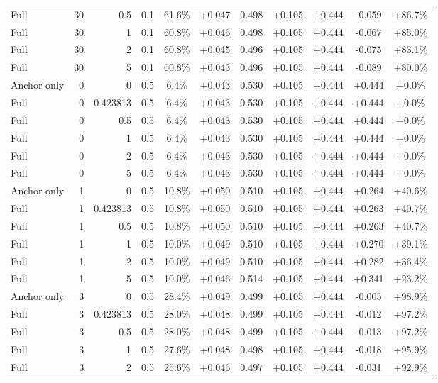 \begin{table}[htbp]
\begin{tabular}{lrrrccccccc}
Full & 30 & 0.5 & 0.1 & 61.6\% & +0.047 & 0.498 & +0.105 & +0.444 & -0.059 & +86.7\% \\
Full & 30 & 1 & 0.1 & 60.8\% & +0.046 & 0.498 & +0.105 & +0.444 & -0.067 & +85.0\% \\
Full & 30 & 2 & 0.1 & 60.8\% & +0.045 & 0.496 & +0.105 & +0.444 & -0.075 & +83.1\% \\
Full & 30 & 5 & 0.1 & 60.8\% & +0.043 & 0.496 & +0.105 & +0.444 & -0.089 & +80.0\% \\
Anchor only & 0 & 0 & 0.5 & 6.4\% & +0.043 & 0.530 & +0.105 & +0.444 & +0.444 & +0.0\% \\
Full & 0 & 0.423813 & 0.5 & 6.4\% & +0.043 & 0.530 & +0.105 & +0.444 & +0.444 & +0.0\% \\
Full & 0 & 0.5 & 0.5 & 6.4\% & +0.043 & 0.530 & +0.105 & +0.444 & +0.444 & +0.0\% \\
Full & 0 & 1 & 0.5 & 6.4\% & +0.043 & 0.530 & +0.105 & +0.444 & +0.444 & +0.0\% \\
Full & 0 & 2 & 0.5 & 6.4\% & +0.043 & 0.530 & +0.105 & +0.444 & +0.444 & +0.0\% \\
Full & 0 & 5 & 0.5 & 6.4\% & +0.043 & 0.530 & +0.105 & +0.444 & +0.444 & +0.0\% \\
Anchor only & 1 & 0 & 0.5 & 10.8\% & +0.050 & 0.510 & +0.105 & +0.444 & +0.264 & +40.6\% \\
Full & 1 & 0.423813 & 0.5 & 10.8\% & +0.050 & 0.510 & +0.105 & +0.444 & +0.263 & +40.7\% \\
Full & 1 & 0.5 & 0.5 & 10.8\% & +0.050 & 0.510 & +0.105 & +0.444 & +0.263 & +40.7\% \\
Full & 1 & 1 & 0.5 & 10.0\% & +0.049 & 0.510 & +0.105 & +0.444 & +0.270 & +39.1\% \\
Full & 1 & 2 & 0.5 & 10.0\% & +0.049 & 0.510 & +0.105 & +0.444 & +0.282 & +36.4\% \\
Full & 1 & 5 & 0.5 & 10.0\% & +0.046 & 0.514 & +0.105 & +0.444 & +0.341 & +23.2\% \\
Anchor only & 3 & 0 & 0.5 & 28.4\% & +0.049 & 0.499 & +0.105 & +0.444 & -0.005 & +98.9\% \\
Full & 3 & 0.423813 & 0.5 & 28.0\% & +0.048 & 0.499 & +0.105 & +0.444 & -0.012 & +97.2\% \\
Full & 3 & 0.5 & 0.5 & 28.0\% & +0.048 & 0.499 & +0.105 & +0.444 & -0.013 & +97.2\% \\
Full & 3 & 1 & 0.5 & 27.6\% & +0.048 & 0.498 & +0.105 & +0.444 & -0.018 & +95.9\% \\
Full & 3 & 2 & 0.5 & 25.6\% & +0.046 & 0.497 & +0.105 & +0.444 & -0.031 & +92.9\% \\

\end{tabular}
\end{table}
